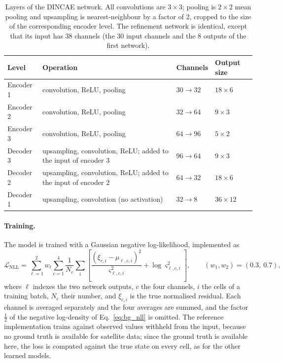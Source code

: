 \documentclass[english, 12pt, a4paper, elec, utf8, a-2b, online]{aaltothesis}
\begin{document}
\begin{table}[htb]
	\centering
	\caption{Layers of the DINCAE network. All convolutions are $3 \times 3$;
	pooling is $2 \times 2$ mean pooling and upsampling is nearest-neighbour by
	a factor of 2, cropped to the size of the corresponding encoder level. The
	refinement network is identical, except that its input has 38 channels (the
	30 input channels and the 8 outputs of the first network).}
	\label{tab:arch_dincae}
	\small
	\begin{tabular}{lL{0.5\textwidth}ll}
		\hline
		Level & Operation & Channels & Output size \\
		\hline
		Encoder 1 & convolution, ReLU, pooling & $30 \to 32$ & $18 \times 6$ \\
		Encoder 2 & convolution, ReLU, pooling & $32 \to 64$ & $9 \times 3$ \\
		Encoder 3 & convolution, ReLU, pooling & $64 \to 96$ & $5 \times 2$ \\
		Decoder 3 & upsampling, convolution, ReLU; added to the input of encoder 3 & $96 \to 64$ & $9 \times 3$ \\
		Decoder 2 & upsampling, convolution, ReLU; added to the input of encoder 2 & $64 \to 32$ & $18 \times 6$ \\
		Decoder 1 & upsampling, convolution (no activation) & $32 \to 8$ & $36 \times 12$ \\
		\hline
	\end{tabular}
\end{table}

\paragraph{Training.}
The model is trained with a Gaussian negative log-likelihood, implemented as
\begin{equation}
	\mathcal{L}_{\mathrm{NLL}} = \sum_{\ell=1}^{2} w_\ell \sum_{c=1}^{4} \frac{1}{N_c} \sum_{i}
	\left[ \frac{(\xi_{c,i} - \mu_{\ell,c,i})^2}{\varsigma_{\ell,c,i}^2} + \log \varsigma_{\ell,c,i}^2 \right],
	\qquad (w_1, w_2) = (0.3,\ 0.7),
	\label{eq:nll}
\end{equation}
where $\ell$ indexes the two network outputs, $c$ the four channels, $i$ the
cells of a training batch, $N_c$ their number, and $\xi_{c,i}$ is the true
normalised residual. Each channel is averaged separately and the four averages
are summed, and the factor $\tfrac{1}{2}$ of the negative log-density of
Eq.~\eqref{eq:bg_nll} is omitted. The reference implementation trains against observed
values withheld from the input, because no ground truth is available for
satellite data; since the ground truth is available here, the loss is computed
against the true state on every cell, as for the other learned models.
\end{document}
